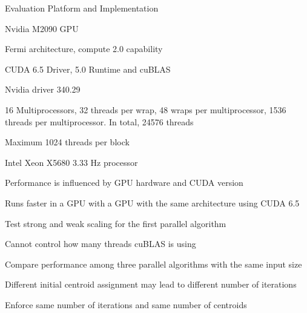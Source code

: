 \documentclass[
nopagebreaks,
style=klope,
fleqn]{powerdot}
\begin{document}
\begin{slide}{Evaluation Platform and Implementation}
  \small
  \begin{compactitem}
  \item{Nvidia M2090 GPU
    \begin{compactitem}
    \item{Fermi architecture, compute 2.0 capability}
    \item{CUDA 6.5 Driver, 5.0 Runtime and cuBLAS}
    \item{Nvidia driver 340.29}
    \item{16 Multiprocessors, 32 threads per wrap, 48 wraps per multiprocessor, 1536 threads per
      multiprocessor. In total, 24576 threads}
    \item{Maximum 1024 threads per block}
    \end{compactitem}
  }
  \item{Intel Xeon X5680 3.33 Hz processor}
  \item{Performance is influenced by GPU hardware and CUDA version
    \begin{compactitem}
    \item{Runs faster in a GPU with a GPU with the same architecture using CUDA 6.5}  
    \end{compactitem}
  }
  \item{Test strong and weak scaling for the first parallel algorithm}
  \item{Cannot control how many threads cuBLAS is using
    \begin{compactitem}
    \item{Compare performance among three parallel algorithms with the same input size}
    \end{compactitem}
  }
  \item{Different initial centroid assignment may lead to different number of iterations
    \begin{compactitem}
    \item{Enforce same number of iterations and same number of centroids}
    \end{compactitem}
  }
  \end{compactitem}
\end{slide}
\end{document}
